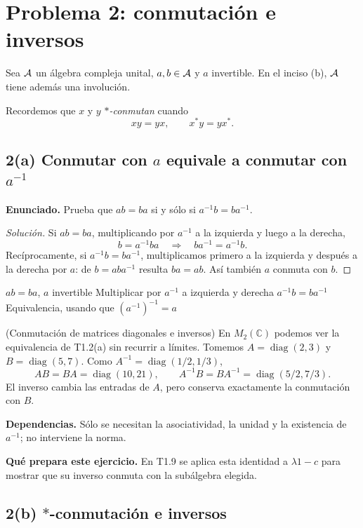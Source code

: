 \section{Problema 2: conmutación e inversos}

Sea $\mathcal A$ un álgebra compleja unital, $a,b\in\mathcal A$ y $a$ invertible. En el inciso (b), $\mathcal A$ tiene
además una involución.

Recordemos que $x$ y $y$ \emph{$*$-conmutan} cuando
\[
 xy=yx,
 \qquad x^*y=yx^*.
\]

\subsection*{2(a) Conmutar con $a$ equivale a conmutar con $a^{-1}$}

\noindent\textbf{Enunciado.} Prueba que $ab=ba$ si y sólo si $a^{-1}b=ba^{-1}$.

\begin{proof}[Solución]
Si $ab=ba$, multiplicando por $a^{-1}$ a la izquierda y luego a la derecha,
\[
 b=a^{-1}ba \quad\Longrightarrow\quad ba^{-1}=a^{-1}b.
\]
Recíprocamente, si $a^{-1}b=ba^{-1}$, multiplicamos primero a la izquierda y después a la
derecha por $a$: de $b=aba^{-1}$ resulta $ba=ab$. Así también $a$ conmuta con $b$.
\end{proof}

\proofdiagram
{$ab=ba$, $a$ invertible}
{Multiplicar por $a^{-1}$ a izquierda y derecha}
{$a^{-1}b=ba^{-1}$}
{Equivalencia, usando que $(a^{-1})^{-1}=a$}

\begin{cthejemplo}{(Conmutación de matrices diagonales e inversos)}
En $M_2(\mathbb C)$ podemos ver la equivalencia de T1.2(a) sin recurrir a límites.
Tomemos $A=\operatorname{diag}(2,3)$ y $B=\operatorname{diag}(5,7)$.
Como $A^{-1}=\operatorname{diag}(1/2,1/3)$,
\[
 AB=BA=\operatorname{diag}(10,21),\qquad
 A^{-1}B=BA^{-1}=\operatorname{diag}(5/2,7/3).
\]
El inverso cambia las entradas de $A$, pero conserva exactamente la conmutación con $B$.
\end{cthejemplo}

\noindent\textbf{Dependencias.} Sólo se necesitan la asociatividad, la unidad y la existencia de $a^{-1}$; no interviene la norma.

\noindent\textbf{Qué prepara este ejercicio.} En T1.9 se aplica esta identidad a $\lambda1-c$ para mostrar que su inverso conmuta con la subálgebra elegida.

\subsection*{2(b) $*$-conmutación e inversos}

